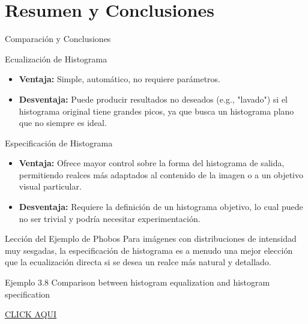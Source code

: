 \documentclass{beamer}
\begin{document}
\section{Resumen y Conclusiones}

\begin{frame}{Comparación y Conclusiones}\footnotesize
    \begin{block}{Ecualización de Histograma}
        \begin{itemize}
            \item \textbf{Ventaja:} Simple, automático, no requiere parámetros.
            \item \textbf{Desventaja:} Puede producir resultados no deseados (e.g., "lavado") si el histograma original tiene grandes picos, ya que busca un histograma plano que no siempre es ideal.
        \end{itemize}
    \end{block}
    \pause
    \begin{alertblock}{Especificación de Histograma}
        \begin{itemize}
            \item \textbf{Ventaja:} Ofrece mayor control sobre la forma del histograma de salida, permitiendo realces más adaptados al contenido de la imagen o a un objetivo visual particular.
            \item \textbf{Desventaja:} Requiere la definición de un histograma objetivo, lo cual puede no ser trivial y podría necesitar experimentación.
        \end{itemize}
    \end{alertblock}
    \pause
    \begin{exampleblock}{Lección del Ejemplo de Phobos}
        Para imágenes con distribuciones de intensidad muy sesgadas, la especificación de histograma es a menudo una mejor elección que la ecualización directa si se desea un realce más natural y detallado.
    \end{exampleblock}
\end{frame}


\begin{frame}[fragile]{Ejemplo 3.8 Comparison between histogram equalization and histogram specification}

\href{run:Ejemplo_3_8_p1.html}{CLICK AQUI}

\end{frame}
\end{document}
